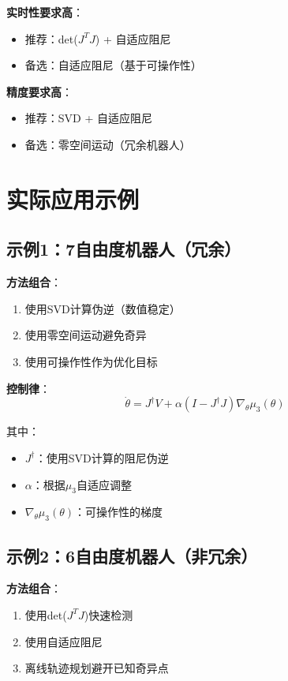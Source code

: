 \documentclass[12pt,a4paper]{article}
\begin{document}
\textbf{实时性要求高}：
\begin{itemize}
\item 推荐：det($J^T J$) + 自适应阻尼
\item 备选：自适应阻尼（基于可操作性）
\end{itemize}

\textbf{精度要求高}：
\begin{itemize}
\item 推荐：SVD + 自适应阻尼
\item 备选：零空间运动（冗余机器人）
\end{itemize}

\section{实际应用示例}

\subsection{示例1：7自由度机器人（冗余）}

\textbf{方法组合}：
\begin{enumerate}
\item 使用SVD计算伪逆（数值稳定）
\item 使用零空间运动避免奇异
\item 使用可操作性作为优化目标
\end{enumerate}

\textbf{控制律}：
\begin{equation}
\dot{\theta} = J^{\dagger}V + \alpha(I - J^{\dagger}J)\nabla_{\theta}\mu_3(\theta)
\end{equation}

其中：
\begin{itemize}
\item $J^{\dagger}$：使用SVD计算的阻尼伪逆
\item $\alpha$：根据$\mu_3$自适应调整
\item $\nabla_{\theta}\mu_3(\theta)$：可操作性的梯度
\end{itemize}

\subsection{示例2：6自由度机器人（非冗余）}

\textbf{方法组合}：
\begin{enumerate}
\item 使用det($J^T J$)快速检测
\item 使用自适应阻尼
\item 离线轨迹规划避开已知奇异点
\end{enumerate}
\end{document}
